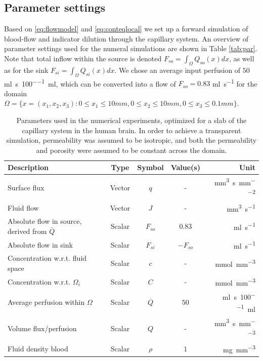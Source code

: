 \documentclass[paper=a4, fontsize=11pt,parskip=half,headings=small]{scrartcl}
\newcommand{\Perf}{Q}
\newcommand{\simu}{k\pascal\second}
\newcommand{\siFmm}{\milli\meter\cubed\per\second}
\newcommand{\siFml}{\milli\litre\per\second}
\newcommand{\siQmm}{\milli\meter\cubed\per\second\per\milli\meter\cubed}
\newcommand{\siPml}{\milli\litre\per\second\per100\milli\litre}
\newcommand{\siq}{\milli\meter\cubed\per\second\per\milli\meter\squared}
\newcommand{\sic}{\milli\mol\per\milli\meter\cubed}
\begin{document}
	\subsection{Parameter settings}
	Based on \eqref{eq:flowmodel} and \eqref{eq:conteqlocal} we set up a forward simulation of blood-flow and indicator dilution through the capillary system.
	An overview of parameter settings used for the numeral simulations are shown in Table \ref{tab:par}. Note that total inflow within the source is denoted $F_{so} = \int_\Omega Q_{so}(x) dx$, as well as for the sink $F_{si} = \int_\Omega Q_{si}(x) dx$. We chose an average input perfusion of $50$\si{\siPml}, which can be converted into a flow of $F_{so} = 0.83$ \si{\siFml} for the domain $\Omega = \{x = (x_1,x_2,x_3) : 0 \leq x_1 \leq 10mm, 0 \leq x_2 \leq 10mm, 0 \leq x_3 \leq 0.1 mm\}$.
	\begin{table}[H]
		\centering
	  \caption{Parameters used in the numerical experiments, optimized for a slab of the capillary system in the human brain. In order to achieve a transparent simulation, permeability was assumed to be isotropic, and both the permeability and porosity were assumed to be constant across the domain.}		
		\begin{tabular}{ l  c  c c  r }
		    Description 							&	Type 	& Symbol 			& Value(s) 				& Unit 				\\
			\toprule
			Surface flux 							&	Vector 			& $q$				& - 					& \si{\siq} 		\\
			Fluid flow								&	Vector			& $J$				& - 					& \si{\siFmm} 		\\
			Absolute flow in source, derived from $\overline{\Perf}$& 	Scalar	& $F_{so}$ 			& \num{0.83}			& \si{\siFml} \\
			Absolute flow in sink 						&		Scalar		& $F_{si}$ 			& $-F_{so}$ 		 	& \si{\siFml}  		\\
			Concentration w.r.t. fluid space			&	Scalar & $c$				& - 					& \si{\sic} 		\\
			Concentration w.r.t. $\Omega_i$		&	Scalar 			& $C$				& - 					& \si{\sic} 		\\
		         Average perfusion within $\Omega$		 &	Scalar & $\overline{\Perf}$ 	& $50$ 					& \si{\siPml}		\\
		         Volume flux/perfusion							 &	Scalar & $\Perf$ 	& - 					& \si{\siQmm}		\\
			Fluid density blood \cite{kenner89} 			& Scalar & $\rho$ 			& $\num{1}$				& \si{\milli\gram\per\cubic\milli\meter} 		\\

\end{tabular}
\end{table}
\end{document}
